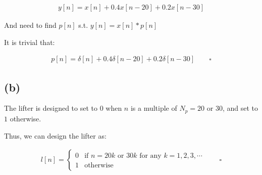 \documentclass{article}
\begin{document}
\begin{align*}
    y[n] = x[n] + 0.4x[n-20] + 0.2x[n-30]
\end{align*}

And need to find $p[n]$ s.t. $y[n] = x[n] * p[n]$
\bigskip

It is trivial that:

\begin{align*}
    p[n] = \delta[n] + 0.4\delta[n-20] + 0.2\delta[n-30] \qquad \square
\end{align*}

\subsection*{(b)}









The lifter is designed to set to $0$ when $n$ is a multiple of $N_p = 20$ or $30$, 
and set to $1$ otherwise.
\bigskip

Thus, we can design the lifter as:

\begin{align*}
    l[n] = \begin{cases}
        0 & \text{if } n = 20k \text{ or } 30k \text{ for any } k = 1, 2, 3, \cdots \\
        1 & \text{otherwise}
    \end{cases} \qquad \square
\end{align*}
\end{document}
